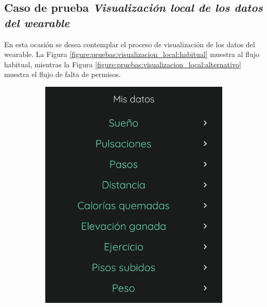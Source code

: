         \clearpage  %
            
        \subsection*{Caso de prueba \textit{Visualización local de los datos del wearable}}

            En esta ocasión se desea contemplar el proceso de visualización de los datos del \gls{wearable}. La Figura \ref{figure:pruebas:visualizacion_local:habitual} muestra al flujo habitual, mientras la Figura \ref{figure:pruebas:visualizacion_local:alternativo} muestra el flujo de falta de permisos. 

            \begin{figure}[htbp]
                \centering
                \begin{subfigure}[c]{0.27\textwidth}
                    \centering
                    \includegraphics[width=1\textwidth]{figures/pruebas/local_wearable/Listado general.png}
                \end{subfigure}

\end{figure}
